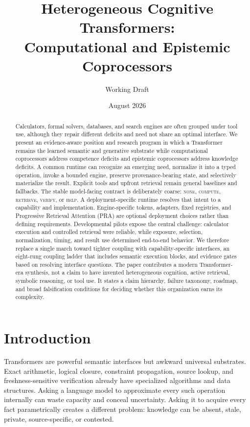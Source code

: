\documentclass[11pt]{article}
\title{Heterogeneous Cognitive Transformers:\\
Computational and Epistemic Coprocessors}
\author{Working Draft}
\date{August 2026}
\begin{document}
\maketitle

\begin{abstract}
Calculators, formal solvers, databases, and search engines are often grouped
under tool use, although they repair different deficits and need not share an
optimal interface.  We present an evidence-aware position and research program
in which a Transformer remains the learned semantic and generative substrate
while computational coprocessors address competence deficits and epistemic
coprocessors address knowledge deficits.  A common runtime can recognize an
emerging need, normalize it into a typed operation, invoke a bounded engine,
preserve provenance-bearing state, and selectively materialize the result.
Explicit tools and upfront retrieval remain general baselines and fallbacks.
The stable model-facing contract is deliberately coarse:
\textsc{none}, \textsc{compute}, \textsc{retrieve}, \textsc{verify}, or
\textsc{help}. A deployment-specific runtime resolves that intent to a
capability and implementation. Engine-specific tokens, adapters, fixed
registries, and Progressive Retrieval Attention (PRA) are optional deployment
choices rather than defining requirements.
Developmental pilots expose the central challenge: calculator execution and
controlled retrieval were reliable, while exposure, selection, normalization,
timing, and result use determined end-to-end behavior.  We therefore replace a
single march toward tighter coupling with capability-specific interfaces, an
eight-rung coupling ladder that includes semantic execution blocks, and
evidence gates based on resolving interface questions.  The paper contributes
a modern Transformer-era synthesis, not a claim to have invented heterogeneous
cognition, active retrieval, symbolic reasoning, or tool use.  It states a
claim hierarchy, failure taxonomy, roadmap, and broad falsification conditions
for deciding whether this organization earns its complexity.
\end{abstract}

\section{Introduction}

Transformers are powerful semantic interfaces but awkward universal
substrates.  Exact arithmetic, logical closure, constraint propagation, source
lookup, and freshness-sensitive verification already have specialized
algorithms and data structures.  Asking a language model to approximate every
such operation internally can waste capacity and conceal uncertainty.  Asking
it to acquire every fact parametrically creates a different problem: knowledge
can be absent, stale, private, source-specific, or contested.
\end{document}
